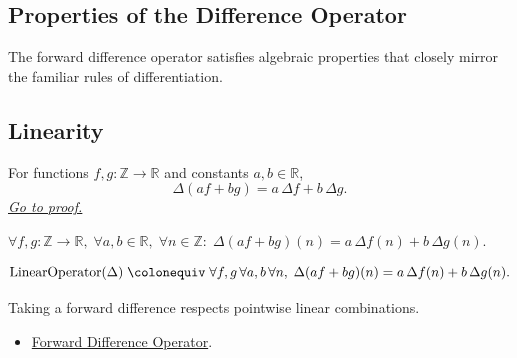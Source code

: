 
\subsection{Properties of the Difference Operator}
\label{subsec:difference-operator-properties}

\begin{exposition}
The forward difference operator satisfies algebraic properties that
closely mirror the familiar rules of differentiation.
\end{exposition}

\subsection*{Linearity}

\begin{proposition}
\label{prop:delta-linearity}
For functions \(f,g : \mathbb{Z} \to \mathbb{R}\) and constants \(a,b \in \mathbb{R}\),
\[
\Delta (a f + b g)
=
a\,\Delta f + b\,\Delta g.
\]
\hyperref[prf:delta-linearity]{\textit{Go to proof.}}
\end{proposition}

\begin{remark*}
\(\forall f,g : \mathbb{Z}\to\mathbb{R},\;
\forall a,b \in \mathbb{R},\;
\forall n \in \mathbb{Z}:\;
\Delta(af+bg)(n) = a\,\Delta f(n) + b\,\Delta g(n)\).
\end{remark*}

\begin{remark*}
\[
  \operatorname{LinearOperator}(\Delta)
  \;\colonequiv\;
  \forall f,g\,\forall a,b\,\forall n,\;
  \Delta(af+bg)(n)=a\,\Delta f(n)+b\,\Delta g(n).
\]
\end{remark*}

\begin{remark*}[Interpretation]
Taking a forward difference respects pointwise linear combinations.
\end{remark*}

\begin{dependencies}
\begin{itemize}
  \item \hyperref[def:forward-difference]{Forward Difference Operator}.
\end{itemize}
\end{dependencies}


